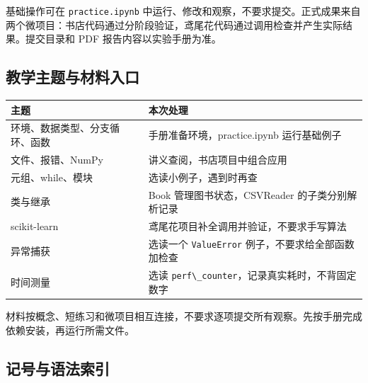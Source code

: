 \documentclass[UTF8,a4paper,11pt,fontset=fandol]{ctexart}
\providecommand{\passthrough}[1]{#1}
\begin{document}
基础操作可在 \passthrough{\lstinline!practice.ipynb!} 中运行、修改和观察，不要求提交。正式成果来自两个微项目：书店代码通过分阶段验证，鸢尾花代码通过调用检查并产生实际结果。提交目录和 PDF 报告内容以实验手册为准。

\subsection{教学主题与材料入口}\label{ux6559ux5b66ux4e3bux9898ux4e0eux6750ux6599ux5165ux53e3}

\begin{longtable}[]{@{}
  >{\raggedright\arraybackslash}p{}
  >{\raggedright\arraybackslash}p{}@{}}
\toprule\noalign{}
\begin{minipage}[b]{\linewidth}\raggedright
主题
\end{minipage} & \begin{minipage}[b]{\linewidth}\raggedright
本次处理
\end{minipage} \\
\midrule\noalign{}
\endhead
\bottomrule\noalign{}
\endlastfoot
环境、数据类型、分支循环、函数 & 手册准备环境，practice.ipynb 运行基础例子 \\
文件、报错、NumPy & 讲义查阅，书店项目中组合应用 \\
元组、while、模块 & 选读小例子，遇到时再查 \\
类与继承 & Book 管理图书状态，CSVReader 的子类分别解析记录 \\
scikit-learn & 鸢尾花项目补全调用并验证，不要求手写算法 \\
异常捕获 & 选读一个 \passthrough{\lstinline!ValueError!} 例子，不要求给全部函数加检查 \\
时间测量 & 选读 \passthrough{\lstinline!perf\_counter!}，记录真实耗时，不背固定数字 \\
\end{longtable}

材料按概念、短练习和微项目相互连接，不要求逐项提交所有观察。先按手册完成依赖安装，再运行所需文件。

\clearpage

\subsection{记号与语法索引}\label{ux8bb0ux53f7ux4e0eux8bedux6cd5ux7d22ux5f15}
\end{document}
